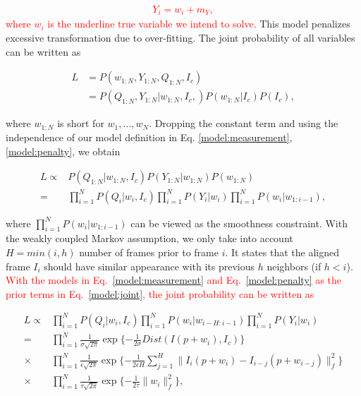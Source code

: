 \documentclass[10pt,journal]{IEEEtran}
\newcommand{\Songfan}[1]{\textcolor{red}{#1}}
\begin{document}
\Songfan{
\begin{align}
\label{model:penalty}
Y_i=w_i+m_Y,
\end{align}
}
\noindent \Songfan{where $w_i$ is the underline true variable we intend to solve.} This model penalizes excessive transformation due to over-fitting. The joint probability of all variables can be written as

\begin{align}
L&=P(w_{1:N},Y_{1:N},Q_{1:N},I_c) \\
 &=P(Q_{1:N},Y_{1:N}|w_{1:N},I_c,)P(w_{1:N}|I_c)P(I_c),
\end{align}

\noindent where $w_{1:N}$ is short for $w_1,\ldots,w_N$. Dropping the constant term and using the independence of our model definition in Eq. \ref{model:measurement}, \ref{model:penalty}, we obtain

\begin{align}
L\propto & P(Q_{1:N}|w_{1:N},I_c) P(Y_{1:N}|w_{1:N}) P(w_{1:N}) \\
				=& \prod_{i=1}^N{P(Q_i|w_i,I_c)} \prod_{i=1}^N{P(Y_i|w_i)} \prod_{i=1}^N {P(w_i|w_{1:i-1})},
\label{model:joint}
\end{align}

\noindent where $\prod_{i=1}^N {P(w_i|w_{1:i-1})}$ can be viewed as the smoothness constraint. With the weakly coupled Markov assumption, we only take into account $H=min(i,h)$ number of frames prior to frame $i$. It states that the aligned frame $I_i$ should have similar appearance with its previous $h$ neighbors (if $h<i$). \Songfan{With the models in Eq.~\ref{model:measurement} and Eq.~\ref{model:penalty} as the prior terms in Eq.~\ref{model:joint}, the joint probability can be written as }

\begin{align}
L\propto & \prod_{i=1}^N{P(Q_i|w_i,I_c)} \prod_{i=1}^N {P(w_i|w_{i-H:i-1})} \prod_{i=1}^N{P(Y_i|w_i)} \\
\label{data_exp}
				=& \prod_{i=1}^N \frac{1}{\sigma \sqrt{2\pi}} \exp\{-\frac{1}{2\sigma}Dist(I(p+w_i),I_c)\}  \\
\label{smooth_exp}
				\times &\prod_{i=1}^N \frac{1}{\epsilon \sqrt{2\pi}} \exp\{-\frac{1}{2\epsilon H}\sum_{j=1}^{H}\parallel{I_i(p+w_i)-I_{i-j}(p+w_{i-j})}\parallel_f^2\} \\
\label{penalty_exp}
				\times &\prod_{i=1}^N \frac{1}{\tau \sqrt{2\pi}} \exp\{-\frac{1}{2\tau}\parallel{w_i}\parallel_f^2\},
\end{align}
\end{document}
